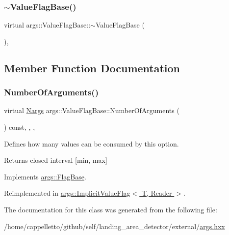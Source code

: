 \subsubsection{\texorpdfstring{$\sim$\+Value\+Flag\+Base()}{~ValueFlagBase()}}
{\footnotesize\ttfamily virtual args\+::\+Value\+Flag\+Base\+::$\sim$\+Value\+Flag\+Base (\begin{DoxyParamCaption}{ }\end{DoxyParamCaption})\hspace{0.3cm}{\ttfamily [inline]}, {\ttfamily [virtual]}}



\subsection{Member Function Documentation}
\mbox{\label{classargs_1_1_value_flag_base_a96a10bfb949ad175dcf2ffba6a6ec3b6}} 
\subsubsection{\texorpdfstring{Number\+Of\+Arguments()}{NumberOfArguments()}}
{\footnotesize\ttfamily virtual \hyperlink{structargs_1_1_nargs}{Nargs} args\+::\+Value\+Flag\+Base\+::\+Number\+Of\+Arguments (\begin{DoxyParamCaption}{ }\end{DoxyParamCaption}) const\hspace{0.3cm}{\ttfamily [inline]}, {\ttfamily [override]}, {\ttfamily [virtual]}, {\ttfamily [noexcept]}}

Defines how many values can be consumed by this option.

\begin{DoxyReturn}{Returns}
closed interval \mbox{[}min, max\mbox{]} 
\end{DoxyReturn}


Implements \hyperlink{classargs_1_1_flag_base_a6007ffeaa767893cb8eff5333d61673b}{args\+::\+Flag\+Base}.



Reimplemented in \hyperlink{classargs_1_1_implicit_value_flag_a7cfc67aca2b32921e722f51d349df2c5}{args\+::\+Implicit\+Value\+Flag$<$ T, Reader $>$}.



The documentation for this class was generated from the following file\+:\begin{DoxyCompactItemize}
\item 
/home/cappelletto/github/self/landing\+\_\+area\+\_\+detector/external/\hyperlink{args_8hxx}{args.\+hxx}\end{DoxyCompactItemize}
